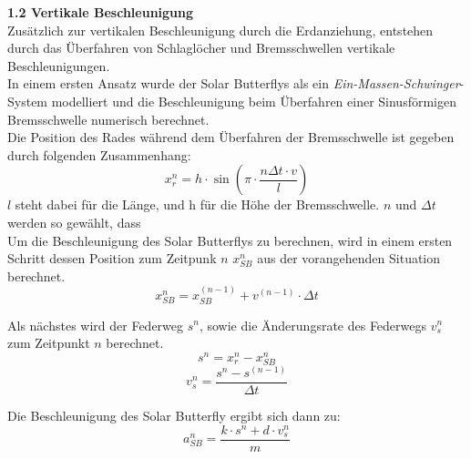 \begin{description}

  \item \textbf{1.2 Vertikale Beschleunigung}\\
  Zusätzlich zur vertikalen Beschleunigung durch die Erdanziehung, entstehen durch das Überfahren von Schlaglöcher und Bremsschwellen vertikale Beschleunigungen.\\
  In einem ersten Ansatz wurde der Solar Butterflys als ein \emph{Ein-Massen-Schwinger}-System modelliert und die Beschleunigung beim Überfahren einer Sinusförmigen Bremsschwelle numerisch berechnet.\\

  Die Position des Rades während dem Überfahren der Bremsschwelle ist gegeben durch folgenden Zusammenhang:
  \begin{equation}
    x_r^n = h \cdot \sin(\pi \cdot \frac{n\Delta t \cdot v}{l})
  \end{equation}
  $l$ steht dabei für die Länge, und h für die Höhe der Bremsschwelle. $n$ und $\Delta t$ werden so gewählt, dass\\

  Um die Beschleunigung des Solar Butterflys zu berechnen, wird in einem ersten Schritt dessen Position zum Zeitpunk $n$ $x_{SB}^n$ aus der vorangehenden Situation berechnet.
  \begin{equation}
    x_{SB}^n = x_{SB}^{(n-1)} + v^{(n-1)} \cdot \Delta t
  \end{equation}

  Als nächstes wird der Federweg $s^n$, sowie die Änderungsrate des Federwegs $v_s^n$ zum Zeitpunkt $n$ berechnet.
  \begin{equation}
    s^n = x_r^n - x_{SB}^n
  \end{equation}
  \begin{equation}
    v_s^n = \frac{s^n - s^{(n-1)}}{\Delta t}
  \end{equation}

  Die Beschleunigung des Solar Butterfly ergibt sich dann zu:\\
  \begin{equation}
    a_{SB}^n = \frac{k \cdot s^n + d \cdot v_s^n}{m}
  \end{equation}


\end{description}
